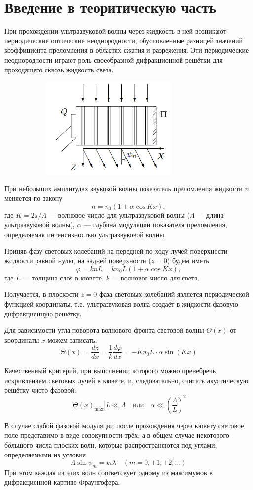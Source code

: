 \documentclass[12pt]{article}
\begin{document}
\section*{Введение в теоритическую часть}
\par
	При прохождении ультразвуковой волны через жидкость в ней возникают периодические оптические неоднородности, обусловленные разницей значений коэффициента преломления в областях сжатия и разрежения. Эти периодические неоднородности играют роль своеобразной дифракционной решётки для проходящего сквозь жидкость света.
\begin{figure}[h!]
	\centering
	\includegraphics[width = 9cm, height = 5cm]{image1.png}
\end{figure}
\par
	При небольших амплитудах звуковой волны показатель преломления жидкости $n$ меняется по закону
\[
	n = n_0 \left(1 + \alpha \cos Kx \right),
\]
где $K = 2 \pi / \Lambda $ --- волновое число для ультразвуковой волны ($\Lambda$ --- длина ультразвуковой волны), $\alpha$ --- глубина модуляции показателя преломления, определяемая интенсивностью ультразвуковой волны.
\par
	Приняв фазу световых колебаний на передней по ходу лучей поверхности жидкости равной нулю, на задней поверхности ($z = 0$) будем иметь
\[
	\varphi = knL = k n_0 L\left(1 + \alpha \cos Kx \right),
\]
где $L$ --- толщина слоя в кювете. $k$ --- волновое число для света.
\par
	Получается, в плоскости $z = 0$ фаза световых колебаний является периодической функцией координаты, т.е. ультразвуковая волна создаёт в жидкости фазовую дифракционную решётку.
\par
	Для зависимости угла поворота волнового фронта световой волны $\Theta(x)$ от координаты $x$ можем записать:
\[
	\Theta(x) = \frac{dz}{dx} = \frac{1}{k} \frac{d\varphi}{dx} = -Kn_0L \cdot \alpha \sin(Kx) 
\]
\par
	Качественный критерий, при выполнении которого можно пренебречь искривлением световых лучей в кювете, и, следовательно, считать акустическую решётку чисто фазовой:
\[
	|\Theta(x)_\text{max}|L \ll \Lambda \quad \text{или} \quad \alpha \ll \left(\frac{\Lambda}{L} \right)^2
\]
\par
	В случае слабой фазовой модуляции после прохождения через кювету световое поле представимо в виде совокупности трёх, а в общем случае некоторого большого числа плоских волн, которые распространяются под углами, определяемыми из условия
\begin{equation}
	\Lambda \sin\psi_m = m \lambda \quad (m = 0, \pm 1, \pm 2,  \dots) \label{MAIN FR}
\end{equation}
При этом каждая из этих волн соответсвует одному из максимумов в дифракционной картине Фраунгофера.
\newpage
\end{document}
